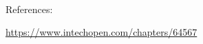 \documentclass[11pt]{article}
\newcommand{\mathse}[1]{\begin{gather*}#1\end{gather*}}
\newcommand{\mat}[1]{\begin{bmatrix} #1 \end{bmatrix}}
\newcommand{\sinput}[1]{}
\begin{document}


\newpage
\mathse{
    \sinput{descentCP_f}
}

\newpage
\begin{center}
    References:
\end{center}
\url{https://www.intechopen.com/chapters/64567}
\end{document}
